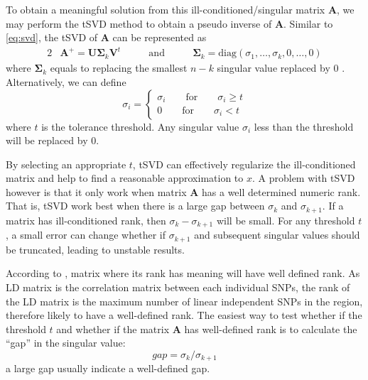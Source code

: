 			To obtain a meaningful solution from this ill-conditioned/singular matrix $\boldsymbol{A}$, we may perform the \gls{tSVD} method to obtain a pseudo inverse of $\boldsymbol{A}$.
			Similar to \cref{eq:svd}, the \gls{tSVD} of $\boldsymbol{A}$ can be represented as 
			\begin{alignat}{2}
				&\boldsymbol{A}^+ = \boldsymbol{U\Sigma}_k\boldsymbol{V}^t  &\qquad\text{and}\qquad  &\boldsymbol{\Sigma}_k=\mathrm{diag}(\sigma_1,\dots,\sigma_k,0,\dots,0)
				\label{eq:tsvd}				
			\end{alignat}
			where $\boldsymbol{\Sigma}_k$ equals to replacing the smallest $n-k$ singular value replaced by 0 \citep{Hansen1987}. 
			Alternatively, we can define
			\begin{equation}
			\sigma_i=\begin{cases}
			\sigma_i\qquad\text{for}\qquad\sigma_i\ge t\\
			0\qquad\text{for}\qquad\sigma_i<t
			\end{cases}
			\end{equation}
			where $t$ is the tolerance threshold. 
			Any singular value $\sigma_i$ less than the threshold will be replaced by 0. 
			
			By selecting an appropriate $t$, \gls{tSVD} can effectively regularize the ill-conditioned matrix and help to find a reasonable approximation to $x$. 
			A problem with \gls{tSVD} however is that it only work when matrix $\boldsymbol{A}$ has a well determined numeric rank\citep{Hansen1987}.
			That is, \gls{tSVD} work best when there is a large gap between $\sigma_k$ and $\sigma_{k+1}$.
			If a matrix has ill-conditioned rank, then $\sigma_k-\sigma_{k+1}$ will be small.
			For any threshold $t$, a small error can change whether if $\sigma_{k+1}$ and subsequent singular values should be truncated, leading to unstable results. 
			
			According to \citet{Hansen1987}, matrix where its rank has meaning will have well defined rank. 
			As \gls{LD} matrix is the correlation matrix between each individual \glspl{SNP}, the rank of the \gls{LD} matrix is the maximum number of linear independent \glspl{SNP} in the region, therefore likely to have a well-defined rank. 
			The easiest way to test whether if the threshold $t$ and whether if the matrix $\boldsymbol{A}$ has well-defined rank is to calculate the ``gap'' in the singular value:
			\begin{equation}
			gap = \sigma_k/\sigma_{k+1}
			\label{eq:gapSingular}
			\end{equation}
			a large gap usually indicate a well-defined gap. 
			
